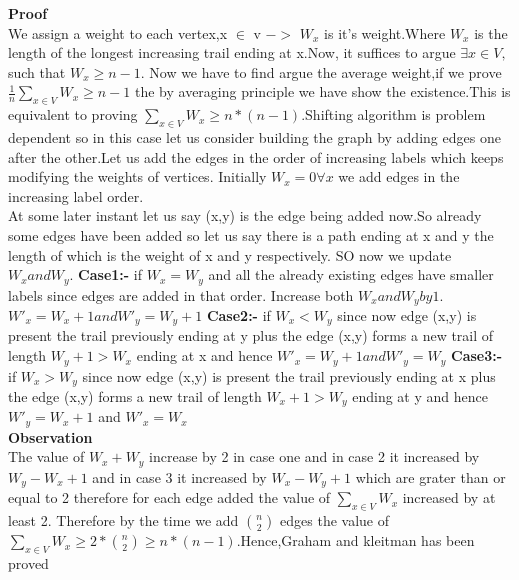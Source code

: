 \textbf{Proof}\\
We assign a weight to each vertex,x $\in$ v $->$ $W_x$ is it's weight.Where $W_x$ is the length of the longest increasing trail ending at x.Now, it suffices to argue $\exists x \in V,$such that $W_x\geq n-1$. Now we have to find argue the average weight,if we prove $\frac{1}{n}\sum_{x \in V} W_x \geq n-1$
the by averaging principle we have show the existence.This is equivalent to proving $\sum_{x \in V} W_x \geq n*(n-1)$.Shifting algorithm is problem dependent so in this case let us consider building the graph by adding edges one after the other.Let us add the edges in the order of increasing labels which keeps modifying the weights of vertices.
Initially $W_x = 0 \forall x$ we add edges in the increasing label order.\\
At some later instant let us say (x,y) is the edge being added now.So already some edges have been added so let us say there is a path ending at x and y the length of which is the weight of x and y respectively. SO now we update $W_x and W_y$.
\textbf{Case1:-} if
$W_x=W_y$  and all the already existing edges have smaller labels since edges are added in that order. Increase both $W_x and W_y by 1$.$W'_x=W_x+1 and W'_y=W_y+1$
\textbf{Case2:-}
if $W_x<W_y$ since now edge (x,y) is present the trail previously ending at y plus the edge (x,y) forms a new trail of length $W_y+1 >W_x$  ending at x and hence $W'_x=W_y+1 and W'_y=W_y$
\textbf{Case3:-}
if $W_x>W_y$ since now edge (x,y) is present the trail previously ending at x plus the edge (x,y) forms a new trail of length  $W_x+1 >W_y$ ending at y and hence $W'_y=W_x+1$ and $W'_x=W_x$\\
\newpage
\textbf{Observation}\\
The value of $W_x+W_y$ increase by 2 in case one and in case 2 it increased by $W_y-W_x+1$ and in case 3 it increased by  $W_x-W_y+1$ which are grater than or equal to 2 therefore for each edge added the value of $\sum_{x \in V} W_x$ increased by at least 2. Therefore by the time we add ${n \choose 2}$ edges the value of  $\sum_{x \in V} W_x \geq 2*{n \choose 2} \geq n*(n-1) $.Hence,Graham and kleitman has been proved
